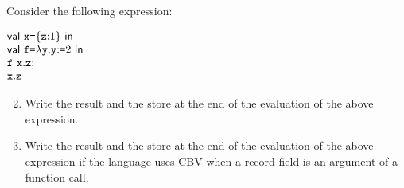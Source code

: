 \begin{enumerate}
Consider the following expression:

$
\begin{array}{@{}l@{}}
  \ebind{\cx}{\{\cz{:}1\}}{ \\
  \ebind{\cf}{\efun{\cy}{\eset{\cy}{2}}}{ \\
  \eseq{\eapp{\cf}{\cx.\cz}}{ \\
  \cx.\cz}}}
\end{array}
$

\begin{enumerate}
  \setcounter{enumii}{1}
  \item Write the result and the store at the end of the evaluation of
  the above expression.
  \item Write the result and the store at the end of the evaluation of
  the above expression
  if the language uses CBV when a record field is an argument
  of a function call.
\end{enumerate}

\end{enumerate}
